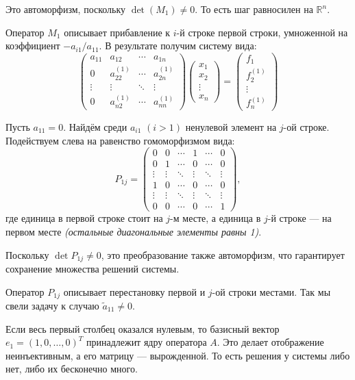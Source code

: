 Это автоморфизм, поскольку $\det(M_1)\neq 0$. То есть шаг равносилен на $\mathbb{R}^n$.

Оператор $M_1$ описывает прибавление к $i$-й строке первой строки, умноженной на коэффициент $-a_{i1}/a_{11}$. В результате получим систему вида:
\[
  \begin{pmatrix}
    a_{11} & a_{12} & \cdots & a_{1n} \\
    0 & a_{22}^{(1)} & \cdots & a_{2n}^{(1)} \\
    \vdots & \vdots & \ddots & \vdots \\
    0 & a_{n2}^{(1)} & \cdots & a_{nn}^{(1)}
  \end{pmatrix}
  \begin{pmatrix}
    x_1 \\
    x_2 \\
    \vdots \\
    x_n
  \end{pmatrix}
  =
  \begin{pmatrix}
    f_1 \\
    f_2^{(1)} \\
    \vdots \\
    f_n^{(1)}
  \end{pmatrix}
\]

Пусть $a_{11}=0$. Найдём среди $a_{i1}$ $(i>1)$ ненулевой элемент на $j$-ой строке. Подействуем слева на равенство гомоморфизмом вида:
\[
P_{1j} = \begin{pmatrix}
0 & 0 & \cdots & 1 & \cdots & 0 \\
0 & 1 & \cdots & 0 & \cdots & 0 \\
\vdots & \vdots & \ddots & \vdots & \ddots & \vdots \\
1 & 0 & \cdots & 0 & \cdots & 0 \\
\vdots & \vdots & \ddots & \vdots & \ddots & \vdots \\
0 & 0 & \cdots & 0 & \cdots & 1
\end{pmatrix},
\]
где единица в первой строке стоит на $j$-м месте, а единица в $j$-й строке — на первом месте \textit{(остальные диагональные элементы равны 1)}.

Поскольку $\det P_{1j}\neq 0$, это преобразование также автоморфизм, что гарантирует сохранение множества решений системы.

Оператор $P_{1j}$ описывает перестановку первой и $j$-ой строки местами. Так мы свели задачу к случаю $\tilde{a}_{11}\neq 0$.

Если весь первый столбец оказался нулевым, то базисный вектор $e_1 = (1, 0, \dots, 0)^T$ принадлежит ядру оператора $A$. Это делает отображение неинъективным, а его матрицу --- вырожденной. То есть решения у системы либо нет, либо их бесконечно много.

